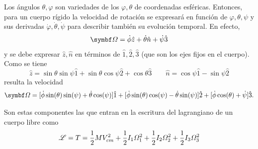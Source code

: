 \documentclass[10pt,oneside]{CBFT_book}
\begin{document}
Los ángulos $\theta,\varphi$ son variedades de los $\varphi,\theta$ de coordenadas esféricas.
Entonces, para un cuerpo rígido la velocidad de rotación se expresará en función de $\varphi,\theta,\psi$ y
sus derivadas $ \dot{\varphi},\dot{\theta},\dot{\psi} $ para describir también su evolución temporal.
En efecto,
\[
	\vb{\Omega} = \dot{\phi}\hat{z} + \dot{\theta}\hat{n} + \dot{\psi}\hat{3}
\]
y se debe expresar $\hat{z},\hat{n}$ en términos de $\hat{1},\hat{2}, \hat{3}$ (que son los ejes fijos en el cuerpo).
Como se tiene 
\[
	\hat{z} = \sin \theta \sin \psi \hat{1} + \sin \theta \cos \psi \hat{2} + \cos \theta \hat{3} \qquad 
	\hat{n} = \cos \psi \hat{1} - \sin \psi \hat{2}
\]
resulta la velocidad 
\[
	\vb{\Omega} = [\dot{\phi}\sin(\theta)\sin(\psi) + \dot{\theta}\cos(\psi) ]\hat{1} +
			[\dot{\phi}\sin(\theta)\cos(\psi) - \dot{\theta}\sin(\psi) ] \hat{2} +
			[\dot{\phi}\cos(\theta) + \dot{\psi} ]\hat{3}.
\]

Son estas componentes las que entran en la escritura del lagrangiano de un cuerpo libre como 
\[
	\mathscr{L} = T = \frac 1 2 M V_{cm}^2 + \frac 1 2 I_1 \Omega_1^2  + \frac 1 2 I_2 \Omega_2^2
	+ \frac 1 2 I_3 \Omega_3^2
\]
\end{document}
